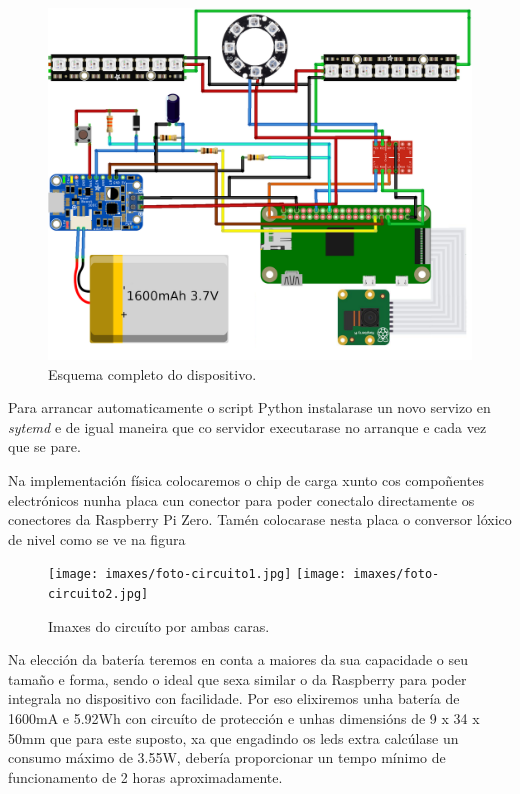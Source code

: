 \begin{itemize}
    \begin{figure}
      \centering
    	\includegraphics[scale=1]{imaxes/esquema-completo.png}
    	\caption{Esquema completo do dispositivo.}
    	\label{f:esquema do dispositivo}
    \end{figure}

    Para arrancar automaticamente o script Python instalarase un novo servizo en \emph{sytemd} e de igual maneira que co servidor executarase no arranque e cada vez que se pare.

    Na implementación física colocaremos o chip de carga xunto cos compoñentes electrónicos nunha placa cun conector para poder conectalo directamente os conectores da Raspberry Pi Zero. Tamén colocarase nesta placa o conversor lóxico de nivel como se ve na figura

    \begin{figure}[tb]
      \centering
    	\texttt{[image: imaxes/foto-circuito1.jpg]}
    	\texttt{[image: imaxes/foto-circuito2.jpg]}
    	\caption{Imaxes do circuíto por ambas caras.}
    	\label{f:fotos do circuíto reverso}
    \end{figure}

    Na elección da batería teremos en conta a maiores da sua capacidade o seu tamaño e forma, sendo o ideal que sexa similar o da Raspberry para poder integrala no dispositivo con facilidade. Por eso elixiremos unha batería de 1600mA e 5.92Wh con circuíto de protección e unhas dimensións de 9 x 34 x 50mm que para este suposto, xa que engadindo os leds extra calcúlase un consumo máximo de 3.55W, debería proporcionar un tempo mínimo de funcionamento de 2 horas aproximadamente.

\end{itemize}

